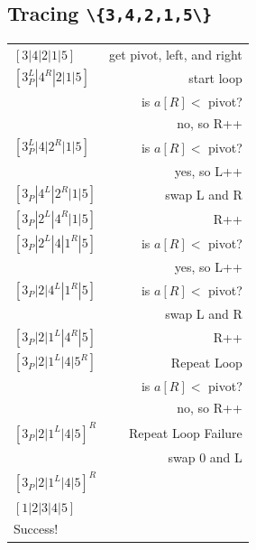 \documentclass[twoside=false,DIV=14]{scrartcl}
\newcommand{\swaplr}{swap L and R}
\newcommand{\nrpp}{no, so R++}
\newcommand{\ylpp}{yes, so L++}
\newcommand{\isrp}{is $a[R] <$ pivot? }
\begin{document}
\subsection{Tracing \lstinline|\{3,4,2,1,5\}|}
\begin{tabular}{lr}
    $[3|4|2|1|5]$         & get pivot, left, and right \\
    $[3_P^L|4^R|2|1|5]$   & start loop \\
                        & \isrp \\
                        & \nrpp \\
    $[3_P^L|4|2^R|1|5]$   & \isrp \\
       & \ylpp \\
    $[3_P|4^L|2^R|1|5]$   & \swaplr \\
    $[3_P|2^L|4^R|1|5]$    & R++ \\
    $[3_P|2^L|4|1^R|5]$    & \isrp \\
                        & \ylpp \\
    $[3_P|2|4^L|1^R|5]$    & \isrp \\
                        & \swaplr \\
    $[3_P|2|1^L|4^R|5]$    & R++ \\
    $[3_P|2|1^L|4|5^R]$     & Repeat Loop  \\
                        & \isrp \\
                        & \nrpp \\
    $[3_P|2|1^L|4|5]^R$ & Repeat Loop Failure \\
                        & swap 0 and L \\
    $[3_P|2|1^L|4|5]^R$   &  \\
    $[1|2|3|4|5]$ & \\
    Success! & \\
\end{tabular}
\end{document}
